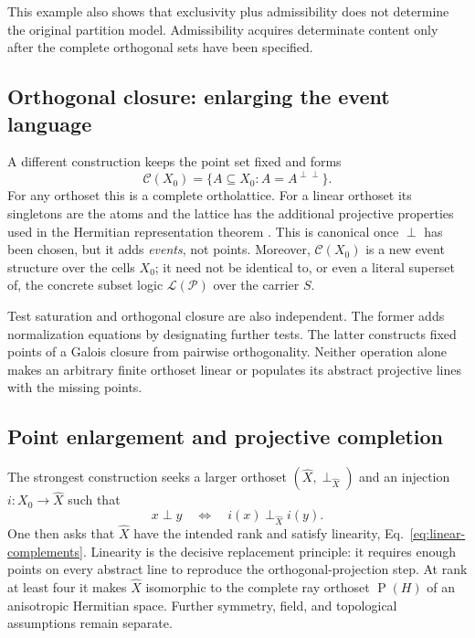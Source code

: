 \documentclass[
  aps,
  pra,
  twocolumn,
  amsmath,
  amssymb,
  longbibliography,
  nofootinbib,
  floatfix
]{revtex4-2}
\newcommand{\cP}{\mathcal P}
\newcommand{\cC}{\mathcal C}
\newcommand{\cL}{\mathcal L}
\newcommand{\Proj}{\operatorname{P}}
\begin{document}
This example also shows that exclusivity plus admissibility does not determine
the original partition model.  Admissibility acquires determinate content only
after the complete orthogonal sets have been specified.

\subsection{Orthogonal closure: enlarging the event language}

A different construction keeps the point set fixed and forms
\begin{equation}
  \cC(X_0)=\{A\subseteq X_0:A=A^{\perp\perp}\}.
  \label{eq:completion-closure-lattice}
\end{equation}
For any orthoset this is a complete ortholattice.  For a linear orthoset its
singletons are the atoms and the lattice has the additional projective
properties used in the Hermitian representation theorem
\cite{PasekaVetterlein2023Linear}.  This is canonical once $\perp$ has been
chosen, but it adds \emph{events}, not points.  Moreover, $\cC(X_0)$ is a new
event structure over the cells $X_0$; it need not be identical to, or even a
literal superset of, the concrete subset logic $\cL(\cP)$ over the carrier $S$.

Test saturation and orthogonal closure are also independent.  The former adds
normalization equations by designating further tests.  The latter constructs
fixed points of a Galois closure from pairwise orthogonality.  Neither operation
alone makes an arbitrary finite orthoset linear or populates its abstract
projective lines with the missing points.

\subsection{Point enlargement and projective completion}

The strongest construction seeks a larger orthoset
$(\widehat X,\perp_{\widehat X})$ and an injection
$i:X_0\to\widehat X$ such that
\begin{equation}
  x\perp y
  \quad\Longleftrightarrow\quad
  i(x)\perp_{\widehat X}i(y).
  \label{eq:faithful-orthoset-extension}
\end{equation}
One then asks that $\widehat X$ have the intended rank and satisfy linearity,
Eq.~\eqref{eq:linear-complements}.  Linearity is the decisive replacement
principle: it requires enough points on every abstract line to reproduce the
orthogonal-projection step.  At rank at least four it makes $\widehat X$
isomorphic to the complete ray orthoset $\Proj(H)$ of an anisotropic Hermitian
space.  Further symmetry, field, and topological assumptions remain separate.
\end{document}
